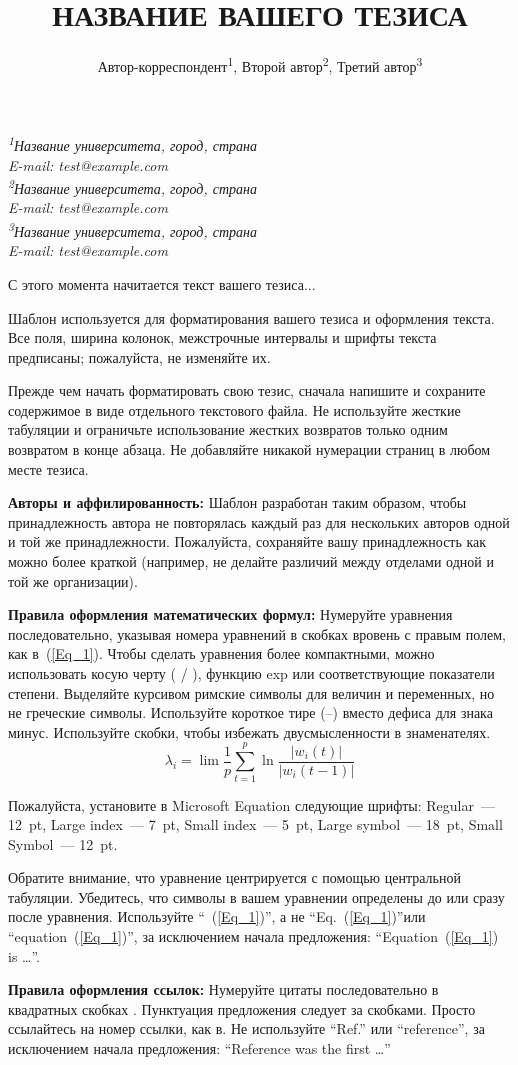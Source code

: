 \documentclass[12pt]{article}
\title{НАЗВАНИЕ ВАШЕГО ТЕЗИСА}
\author{Автор-корреспондент\textsuperscript{1}, Второй автор\textsuperscript{2}, Третий автор\textsuperscript{3}}
\date{}
\makeatletter
\renewcommand{\maketitle}{%
    \begin{center}
        \Large\@title
        
        \vspace{0.4cm}
        \large\@author
        
        \vspace{0.5cm}
        \normalsize\textit{\textsuperscript{1}Название университета, город, страна\\
          E-mail: test@example.com\\
          \textsuperscript{2}Название университета, город, страна\\
          E-mail: test@example.com\\
          \textsuperscript{3}Название университета, город, страна\\
          E-mail: test@example.com\\}
    \end{center}
}
\makeatother
\begin{document}
\maketitle

С этого момента начитается текст вашего тезиса...

Шаблон используется для форматирования вашего тезиса и оформления текста. Все поля, ширина колонок, межстрочные интервалы и шрифты текста предписаны; пожалуйста, не изменяйте их.

Прежде чем начать форматировать свою тезис, сначала напишите и сохраните содержимое в виде отдельного текстового файла. Не используйте жесткие табуляции и ограничьте использование жестких возвратов только одним возвратом в конце абзаца. Не добавляйте никакой нумерации страниц в любом месте тезиса. 

\textbf{Авторы и аффилированность:}
Шаблон разработан таким образом, чтобы принадлежность автора не повторялась каждый раз для нескольких авторов одной и той же принадлежности. Пожалуйста, сохраняйте вашу принадлежность как можно более краткой (например, не делайте различий между отделами одной и той же организации).

\textbf{Правила оформления математических формул:}
Нумеруйте уравнения последовательно, указывая номера уравнений в скобках вровень с правым полем, как в~(\ref{Eq_1}). Чтобы сделать уравнения более компактными, можно использовать косую черту ( / ), функцию exp или соответствующие показатели степени. Выделяйте курсивом римские символы для величин и переменных, но не греческие символы. Используйте короткое тире (--) вместо дефиса для знака минус. Используйте скобки, чтобы избежать двусмысленности в знаменателях. 
\begin{equation}
\label{Eq_1}
\lambda_i = \lim \frac{1}{p} \sum_{t=1}^p \ln \frac{|w_i (t)|}{|w_i (t-1)|}
\end{equation}

Пожалуйста, установите в Microsoft Equation следующие шрифты: Regular~--- 12~pt, Large index~--- 7~pt, Small index~--- 5~pt, Large symbol~--- 18~pt, Small Symbol~--- 12~pt.

Обратите внимание, что уравнение центрируется с помощью центральной табуляции. Убедитесь, что символы в вашем уравнении определены до или сразу после уравнения. Используйте ``~(\ref{Eq_1})'', а не ``Eq.~(\ref{Eq_1})''или ``equation~(\ref{Eq_1})'', за исключением начала предложения:
``Equation~(\ref{Eq_1}) is \ldots{}''.

\textbf{Правила оформления ссылок:}
Нумеруйте цитаты последовательно в квадратных скобках \cite{1}. Пунктуация предложения следует за скобками\cite{1}. Просто ссылайтесь на номер ссылки, как в\cite{2}. Не используйте ``Ref.\cite{3}'' или ``reference\cite{3}'', за исключением начала предложения: ``Reference\cite{4} was the first \ldots{}''
\end{document}
